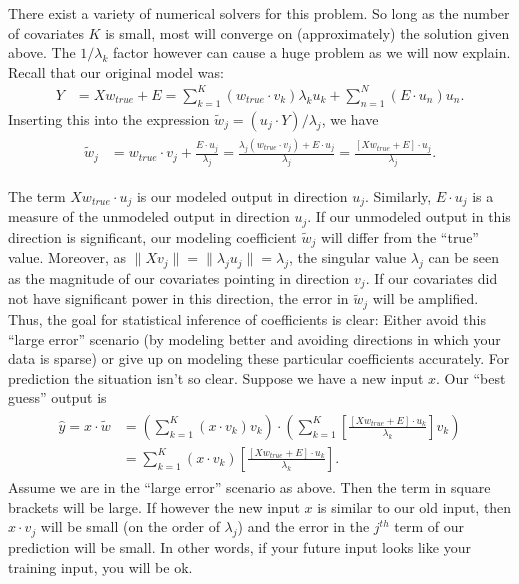 There exist a variety of numerical solvers for this problem.  So long as the number of covariates $K$ is small, most will converge on (approximately) the solution given above.  The $1/\lambda_k$ factor however can cause a huge problem as we will now explain.  Recall that our original model was:
\begin{align*}
  Y &= Xw_{true} + E = \sum_{k=1}^K (w_{true}\cdot v_k)\lambda_k u_k + \sum_{n=1}^N(E\cdot u_n)u_n.
\end{align*}
Inserting this into the expression $\tilde w_j = (u_j\cdot Y)/\lambda_j$, we have
\begin{align}
  \begin{split}
    \tilde w_j &= w_{true}\cdot v_j + \frac{E\cdot u_j}{\lambda_j}
    = \frac{\lambda_j(w_{true}\cdot v_j) + E\cdot u_j}{\lambda_j}
    = \frac{\left[ Xw_{true} + E \right]\cdot u_j}{\lambda_j}.
  \end{split}
  \label{linear:align:coefficient-with-error}
\end{align}

The term $Xw_{true}\cdot u_j$ is our modeled output in direction $u_j$.  Similarly, $E\cdot u_j$ is a measure of the unmodeled output in direction $u_j$.  If our unmodeled output in this direction is significant, our modeling coefficient $\tilde w_j$ will differ from the ``true'' value.  Moreover, as $\|Xv_j\| = \|\lambda_ju_j\| = \lambda_j$, the singular value $\lambda_j$ can be seen as the magnitude of our covariates pointing in direction $v_j$.  If our covariates did not have significant power in this direction, the error in $\tilde w_j$ will be amplified.  Thus, the goal for statistical inference of coefficients is clear:  Either avoid this ``large error'' scenario (by modeling better and avoiding directions in which your data is sparse) or give up on modeling these particular coefficients accurately.  For prediction the situation isn't so clear.  Suppose we have a new input $x$.  Our ``best guess'' output is 
\begin{align}
  \begin{split}
    \hat y = x\cdot \tilde w & = \left( \sum_{k=1}^K(x\cdot v_k)v_k \right)\cdot \left( \sum_{k=1}^K \left[ \frac{\left[ Xw_{true} + E \right]\cdot u_k}{\lambda_k} \right]v_k\right) \\
    &= \sum_{k=1}^K(x\cdot v_k)\left[ \frac{ \left[ Xw_{true} + E \right]\cdot u_k}{\lambda_k} \right].
  \end{split}
  \label{linear:align:fundamental}
\end{align}
Assume we are in the ``large error'' scenario as above.  Then the term in square brackets will be large.  If however the new input $x$ is similar to our old input, then $x\cdot v_j$ will be small (on the order of $\lambda_j$) and the error in the $j^{th}$ term of our prediction will be small.  In other words, if your future input looks like your training input, you will be ok.

